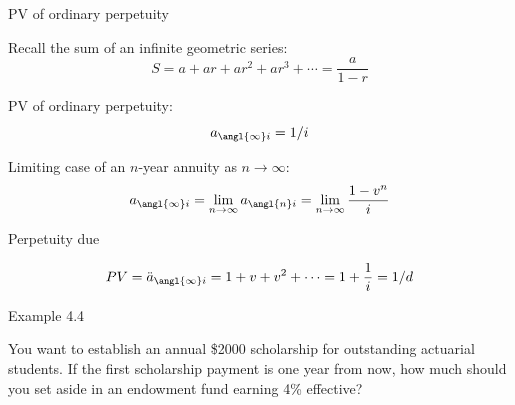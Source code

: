 \documentclass{beamer}
\begin{document}
\begin{frame}{PV of ordinary perpetuity}

Recall the sum of an infinite geometric series:
\[
S = a + ar + ar^2 + ar^3 + \cdots = \frac{a}{1-r}
\]

PV of ordinary perpetuity:
\[
a_{\angl{\infty}i} = 1/i
\]

Limiting case of an $n$-year annuity as $n \to \infty$:
\[
a_{\angl{\infty}i} = \lim_{n\to\infty} a_{\angl{n}i} = \lim_{n\to\infty} \frac{1-v^n}{i}
\]

\vfill
\end{frame}

\begin{frame}{Perpetuity due}

\begin{center}
\end{center}

\[
PV = \ddot{a}_{\angl{\infty}i} = 1 + v + v^2 + \cdots = 1 + \frac{1}{i} = 1/d
\]

\vfill
\end{frame}

\begin{frame}{Example 4.4}

You want to establish an annual \$2000 scholarship for outstanding actuarial students. If the first scholarship payment is one year from now, how much should you set aside in an endowment fund earning 4\% effective?

\bigskip
\begin{center}
\end{center}

\vfill
\end{frame}
\end{document}
